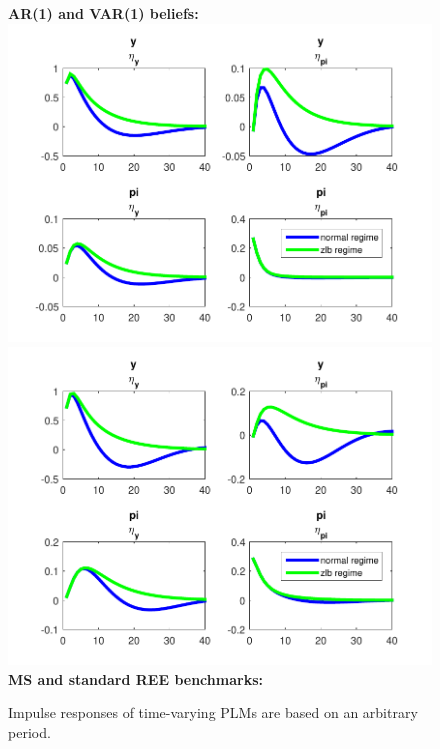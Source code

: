 \documentclass[12pt,reqno]{article}
\numberwithin{equation}{section}
\begin{document}
\begin{figure}[H]
\caption{Impulse responses of time-varying PLMs are based on an arbitrary period.}
\label{nkpc_impulse}
\textbf{AR(1) and VAR(1) beliefs:}\\
\includegraphics[scale=0.6]{NKPC_ree_init_AR1_IR.pdf}
\includegraphics[scale=0.6]{NKPC_ree_init_VAR_IR.pdf}\\

\textbf{MS and standard REE benchmarks: }\\


\end{figure}
\end{document}
